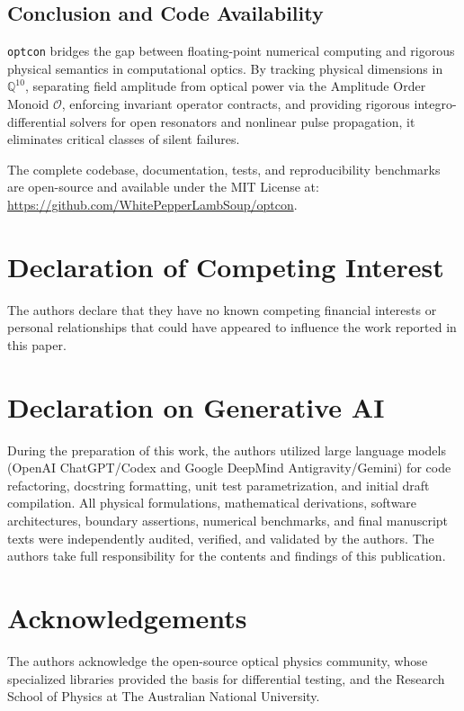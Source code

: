\documentclass[preprint,12pt]{elsarticle}
\begin{document}
\subsection{Conclusion and Code Availability}

\texttt{optcon} bridges the gap between floating-point numerical computing and rigorous physical semantics in computational optics. By tracking physical dimensions in $\mathbb{Q}^{10}$, separating field amplitude from optical power via the Amplitude Order Monoid $\mathcal{O}$, enforcing invariant operator contracts, and providing rigorous integro-differential solvers for open resonators and nonlinear pulse propagation, it eliminates critical classes of silent failures.

The complete codebase, documentation, tests, and reproducibility benchmarks are open-source and available under the MIT License at:\\
\url{https://github.com/WhitePepperLambSoup/optcon}.

\section*{Declaration of Competing Interest}
The authors declare that they have no known competing financial interests or personal relationships that could have appeared to influence the work reported in this paper.

\section*{Declaration on Generative AI}
During the preparation of this work, the authors utilized large language models (OpenAI ChatGPT/Codex and Google DeepMind Antigravity/Gemini) for code refactoring, docstring formatting, unit test parametrization, and initial draft compilation. All physical formulations, mathematical derivations, software architectures, boundary assertions, numerical benchmarks, and final manuscript texts were independently audited, verified, and validated by the authors. The authors take full responsibility for the contents and findings of this publication.

\section*{Acknowledgements}
The authors acknowledge the open-source optical physics community, whose specialized libraries provided the basis for differential testing, and the Research School of Physics at The Australian National University.



\end{document}
